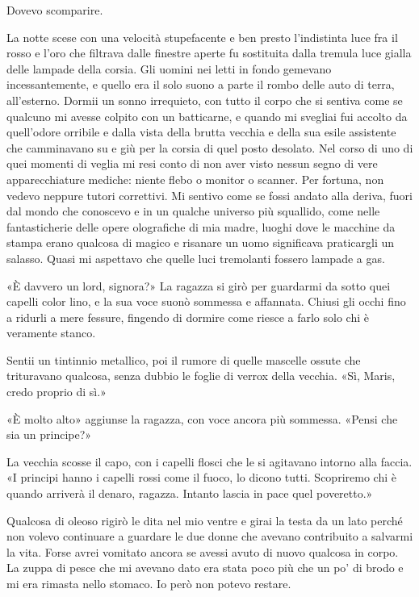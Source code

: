 Dovevo scomparire.

\begin{figure}
	\centering
	\def\svgwidth{\columnwidth}
	\scalebox{0.2}{}
\end{figure}

La notte scese con una velocità stupefacente e ben presto l'indistinta
luce fra il rosso e l'oro che filtrava dalle finestre aperte fu
sostituita dalla tremula luce gialla delle lampade della corsia. Gli
uomini nei letti in fondo gemevano incessantemente, e quello era il solo
suono a parte il rombo delle auto di terra, all'esterno. Dormii un sonno
irrequieto, con tutto il corpo che si sentiva come se qualcuno mi avesse
colpito con un batticarne, e quando mi svegliai fui accolto da
quell'odore orribile e dalla vista della brutta vecchia e della sua
esile assistente che camminavano su e giù per la corsia di quel posto
desolato. Nel corso di uno di quei momenti di veglia mi resi conto di
non aver visto nessun segno di vere apparecchiature mediche: niente
flebo o monitor o scanner. Per fortuna, non vedevo neppure tutori
correttivi. Mi sentivo come se fossi andato alla deriva, fuori dal mondo
che conoscevo e in un qualche universo più squallido, come nelle
fantasticherie delle opere olografiche di mia madre, luoghi dove le
macchine da stampa erano qualcosa di magico e risanare un uomo
significava praticargli un salasso. Quasi mi aspettavo che quelle luci
tremolanti fossero lampade a gas.

«È davvero un lord, signora?» La ragazza si girò per guardarmi da sotto
quei capelli color lino, e la sua voce suonò sommessa e affannata.
Chiusi gli occhi fino a ridurli a mere fessure, fingendo di dormire come
riesce a farlo solo chi è veramente stanco.

Sentii un tintinnio metallico, poi il rumore di quelle mascelle ossute
che trituravano qualcosa, senza dubbio le foglie di verrox della
vecchia. «Sì, Maris, credo proprio di sì.»

«È molto alto» aggiunse la ragazza, con voce ancora più sommessa. «Pensi
che sia un principe?»

La vecchia scosse il capo, con i capelli flosci che le si agitavano
intorno alla faccia. «I principi hanno i capelli rossi come il fuoco, lo
dicono tutti. Scopriremo chi è quando arriverà il denaro, ragazza.
Intanto lascia in pace quel poveretto.»

Qualcosa di oleoso rigirò le dita nel mio ventre e girai la testa da un
lato perché non volevo continuare a guardare le due donne che avevano
contribuito a salvarmi la vita. Forse avrei vomitato ancora se avessi
avuto di nuovo qualcosa in corpo. La zuppa di pesce che mi avevano dato
era stata poco più che un po' di brodo e mi era rimasta nello stomaco.
Io però non potevo restare.

